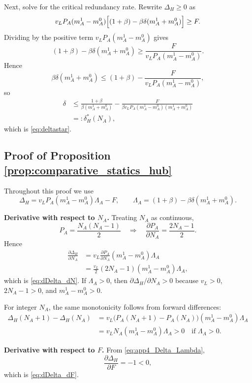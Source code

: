 Next, solve for the critical redundancy rate. Rewrite $\Delta_H\ge 0$ as
\[
v_L P_A(m_A^1-m_A^0)\Bigl[(1+\beta)-\beta\delta(m_A^1+m_A^0)\Bigr]\ge F.
\]
Dividing by the positive term $v_L P_A(m_A^1-m_A^0)$ gives
\[
(1+\beta)-\beta\delta(m_A^1+m_A^0)
\ge
\frac{F}{v_L P_A(m_A^1-m_A^0)}.
\]
Hence
\[
\beta\delta(m_A^1+m_A^0)
\le
(1+\beta)-\frac{F}{v_L P_A(m_A^1-m_A^0)},
\]
so
\begin{align}
\delta
&\le
\frac{1+\beta}{\beta(m_A^1+m_A^0)}
-
\frac{F}{\beta v_L P_A(m_A^1-m_A^0)(m_A^1+m_A^0)}
\nonumber\\
&=:\delta_H^*(N_A),
\label{eq:app4_deltastar}
\end{align}
which is \eqref{eq:deltastar}.

\subsection{Proof of Proposition \ref{prop:comparative_statics_hub}}

Throughout this proof we use
\[
\Delta_H=v_L P_A(m_A^1-m_A^0)\Lambda_A-F,
\qquad
\Lambda_A=(1+\beta)-\beta\delta(m_A^1+m_A^0).
\]

\noindent\textbf{Derivative with respect to $N_A$.}
Treating $N_A$ as continuous,
\[
P_A=\frac{N_A(N_A-1)}{2}
\quad\Rightarrow\quad
\frac{\partial P_A}{\partial N_A}=\frac{2N_A-1}{2}.
\]
Hence
\begin{align}
\frac{\partial \Delta_H}{\partial N_A}
&=
v_L\frac{\partial P_A}{\partial N_A}(m_A^1-m_A^0)\Lambda_A
\nonumber\\
&=
\frac{v_L}{2}(2N_A-1)(m_A^1-m_A^0)\Lambda_A,
\label{eq:app4_dDelta_dNA}
\end{align}
which is \eqref{eq:dDelta_dN}. If $\Lambda_A>0$, then $\partial\Delta_H/\partial N_A>0$ because $v_L>0$, $2N_A-1>0$, and $m_A^1-m_A^0>0$.

For integer $N_A$, the same monotonicity follows from forward differences:
\begin{align}
\Delta_H(N_A+1)-\Delta_H(N_A)
&=
v_L\bigl(P_A(N_A+1)-P_A(N_A)\bigr)(m_A^1-m_A^0)\Lambda_A
\nonumber\\
&=
v_LN_A(m_A^1-m_A^0)\Lambda_A
>0
\quad\text{if }\Lambda_A>0.
\label{eq:app4_forward_difference}
\end{align}

\noindent\textbf{Derivative with respect to $F$.}
From \eqref{eq:app4_Delta_Lambda},
\begin{equation}
\frac{\partial \Delta_H}{\partial F}=-1<0,
\label{eq:app4_dDelta_dF}
\end{equation}
which is \eqref{eq:dDelta_dF}.

